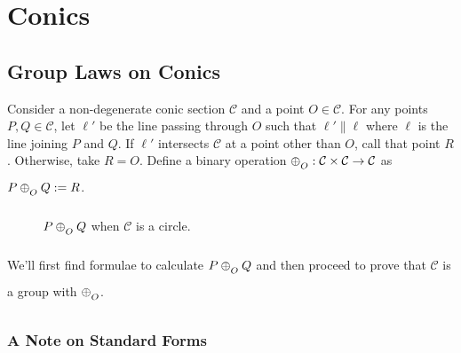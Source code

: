 \chapter{Conics} \label{ch:conics}

\section{Group Laws on Conics}

Consider a non-degenerate conic section $\mathcal{C}$ and a point $O \in
\mathcal{C}$. For any points $P,Q\in\mathcal{C}$, let $\ell'$ be the line passing
through $O$ such that $\ell' \parallel \ell$ where $\ell$ is the line joining $P$
and $Q$. If $\ell'$ intersects $\mathcal{C}$ at a point other than $O$, call that
point $R$. Otherwise, take $R=O$. Define a binary operation
$\conop : \mathcal{C} \times \mathcal{C} \to \mathcal{C}$ as $P \conop Q := R$.
\vspace{1ex}

\begin{figure}[H]
    \center

    \caption{$P \conop Q$ when $\mathcal{C}$ is a circle.}
\end{figure}

We'll first find formulae to calculate $P \conop Q$ and then proceed to prove
that $\mathcal{C}$ is a group with $\conop$.
\subsection*{A Note on Standard Forms}

